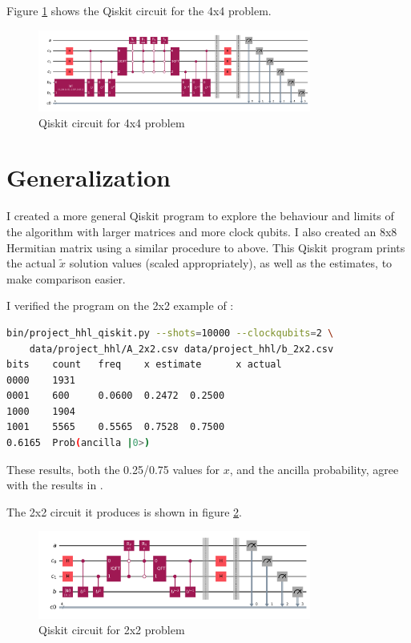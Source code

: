 \documentclass[12pt]{extarticle}
\begin{document}
Figure \ref{fig:hhl_4x4_qiskit} shows the Qiskit circuit for the 4x4 problem.
\begin{figure}[H]
\centering
\includegraphics[width=0.80\textwidth]{images/project_hhl_4x4.png}
\caption{Qiskit circuit for 4x4 problem}
\label{fig:hhl_4x4_qiskit}
\end{figure}

\newpage

\section{Generalization}\label{sec:generalization}

I created a more general Qiskit program to explore the behaviour and limits of the algorithm with larger matrices and more clock qubits.
I also created an 8x8 Hermitian matrix using a similar procedure to above.
This Qiskit program prints the actual $\tilde{x}$ solution values (scaled appropriately), as well as the estimates, to make comparison easier.

I verified the program on the 2x2 example of \cite{zaman2023step}:
\begin{lstlisting}[language=Bash]
bin/project_hhl_qiskit.py --shots=10000 --clockqubits=2 \
    data/project_hhl/A_2x2.csv data/project_hhl/b_2x2.csv
bits    count   freq    x estimate      x actual
0000    1931
0001    600     0.0600  0.2472  0.2500
1000    1904
1001    5565    0.5565  0.7528  0.7500
0.6165  Prob(ancilla |0>)
\end{lstlisting}

These results, both the 0.25/0.75 values for $x$, and the ancilla probability, agree with the results in \cite{zaman2023step}.

The 2x2 circuit it produces is shown in figure \ref{fig:hhl_2x2_qiskit}.
\begin{figure}[H]
\centering
\includegraphics[width=0.80\textwidth]{images/project_hhl_2x2.png}
\caption{Qiskit circuit for 2x2 problem}
\label{fig:hhl_2x2_qiskit}
\end{figure}
\end{document}
